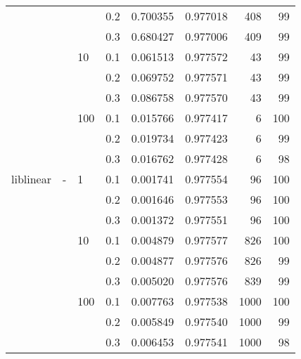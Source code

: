 \begin{table}[H]
\begin{tabular}{llllrrrr}
          &   &     & 0.2 &  0.700355 &  0.977018 &     408 &    99 \\
          &   &     & 0.3 &  0.680427 &  0.977006 &     409 &    99 \\
          &   & 10  & 0.1 &  0.061513 &  0.977572 &      43 &    99 \\
          &   &     & 0.2 &  0.069752 &  0.977571 &      43 &    99 \\
          &   &     & 0.3 &  0.086758 &  0.977570 &      43 &    99 \\
          &   & 100 & 0.1 &  0.015766 &  0.977417 &       6 &   100 \\
          &   &     & 0.2 &  0.019734 &  0.977423 &       6 &    99 \\
          &   &     & 0.3 &  0.016762 &  0.977428 &       6 &    98 \\
liblinear & - & 1   & 0.1 &  0.001741 &  0.977554 &      96 &   100 \\
          &   &     & 0.2 &  0.001646 &  0.977553 &      96 &   100 \\
          &   &     & 0.3 &  0.001372 &  0.977551 &      96 &   100 \\
          &   & 10  & 0.1 &  0.004879 &  0.977577 &     826 &   100 \\
          &   &     & 0.2 &  0.004877 &  0.977576 &     826 &    99 \\
          &   &     & 0.3 &  0.005020 &  0.977576 &     839 &    99 \\
          &   & 100 & 0.1 &  0.007763 &  0.977538 &    1000 &   100 \\
          &   &     & 0.2 &  0.005849 &  0.977540 &    1000 &    99 \\
          &   &     & 0.3 &  0.006453 &  0.977541 &    1000 &    98 \\
\bottomrule
\end{tabular}
\end{table}
